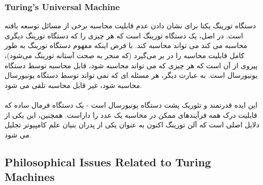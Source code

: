 \documentclass[10pt,a4paper]{article}
\begin{document}
            \subsubsection{Turing's Universal Machine}
دستگاه تورینگ یکتا برای نشان دادن عدم قابلیت محاسبه برخی از مسائل توسعه یافته است. در اصل، یک دستگاه تورینگ است که هر چیزی را که دستگاه تورینگ دیگری محاسبه می کند می تواند محاسبه کند. با فرض اینکه مفهوم دستگاه تورینگ به طور کامل قابلیت محاسبه را در بر می‌گیرد (که منجر به صحت آستانه تورینگ می‌شود)، پیروی از آن است که هر چیزی که می تواند محاسبه شود، قابل محاسبه توسط دستگاه یونیورسال است. به عبارت دیگر، هر مسئله ای که نمی تواند توسط دستگاه یونیورسال محاسبه شود، غیر قابل محاسبه تلقی می شود.
                \\
                \\
                این ایده قدرتمند و تئوریک پشت دستگاه یونیورسال است - یک دستگاه فرمال ساده که قابلیت درک همه فرآیندهای ممکن در محاسبه یک عدد را داراست. همچنین، این یکی از دلایل اصلی است که آلن تورینگ اکنون به عنوان یکی از پدران بنیان علم کامپیوتر تجلیل می شود.\cite{sep-turing-machine}
            \subsection{Philosophical Issues Related to Turing Machines}             
\end{document}
